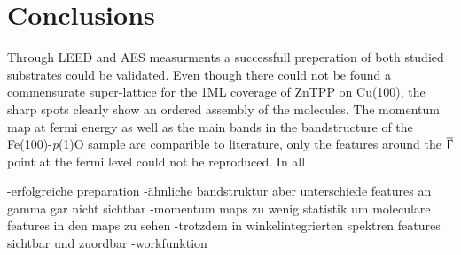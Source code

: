 \chapter{Conclusions}

Through LEED and AES measurments a successfull preperation of both studied substrates could be validated.
Even though there could not be found a commensurate super-lattice for the 1ML coverage of ZnTPP on Cu(100), the sharp spots clearly show an ordered assembly of the molecules.
The momentum map at fermi energy as well as the main bands in the bandstructure of the Fe(100)-\textit{p}(1)O sample are comparible to literature, only the features around the $\overline{\Upgamma}$ point at the fermi level could not be reproduced.
In all

-erfolgreiche preparation
-ähnliche bandstruktur aber unterschiede 
features an gamma gar nicht sichtbar
-momentum maps zu wenig statistik um moleculare features in den maps zu sehen 
-trotzdem in winkelintegrierten spektren features sichtbar und zuordbar
-workfunktion
